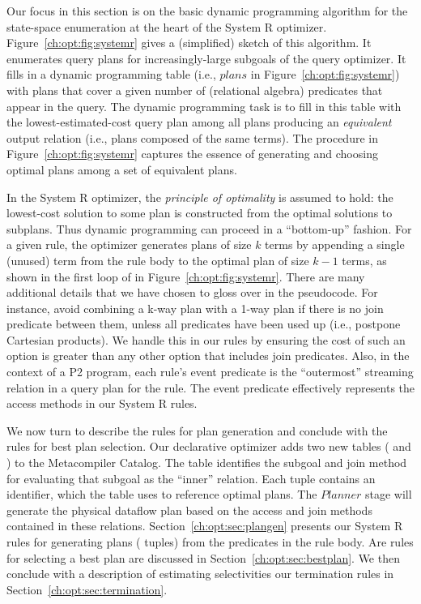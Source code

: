 Our focus in this section is on the basic dynamic programming algorithm for the
state-space enumeration at the heart of the System R optimizer.
Figure~\ref{ch:opt:fig:systemr} gives a (simplified) sketch of this
algorithm.  It enumerates query plans for increasingly-large subgoals of the
query optimizer.  It fills in a dynamic programming table (i.e., $plans$ in
Figure~\ref{ch:opt:fig:systemr}) with plans that cover a given number of
(relational algebra) predicates that appear in the query.  The dynamic
programming task is to fill in this table with the lowest-estimated-cost query
plan among all plans producing an {\em equivalent} output relation (i.e., plans
composed of the same terms).  The  procedure in
Figure~\ref{ch:opt:fig:systemr} captures the essence of generating and
choosing optimal plans among a set of equivalent plans.

In the System R optimizer, the {\em principle of optimality} is assumed to
hold: the lowest-cost solution to some plan is constructed from the optimal
solutions to subplans.  Thus dynamic programming can proceed in a ``bottom-up''
fashion.  For a given rule, the optimizer generates plans of size $k$ terms by
appending a single (unused) term from the rule body to the optimal plan of size
$k-1$ terms, as shown in the first loop of  in
Figure~\ref{ch:opt:fig:systemr}.  There are many additional details that we
have chosen to gloss over in the pseudocode.  For instance, avoid combining a
k-way plan with a 1-way plan if there is no join predicate between them, unless
all predicates have been used up (i.e., postpone Cartesian products).  We
handle this in our \OVERLOG rules by ensuring the cost of such an option is
greater than any other option that includes join predicates.  Also, in the
context of a P2 program, each rule's event predicate is the ``outermost''
streaming relation in a query plan for the rule.  The event predicate
effectively represents the access methods in our System R rules.

We now turn to describe the \OVERLOG rules for plan generation and conclude
with the rules for best plan selection.  Our declarative optimizer adds two new
tables ( and ) to the Metacompiler Catalog.  The
 table identifies the subgoal and join method for evaluating that
subgoal as the ``inner'' relation.  Each  tuple contains an
identifier, which the  table uses to reference optimal plans.  The
$Planner$ stage will generate the physical dataflow plan based on the access
and join methods contained in these relations.
Section~\ref{ch:opt:sec:plangen} presents our System R rules for generating
plans ( tuples) from the predicates in the rule body.  Are rules for
selecting a best plan are discussed in Section~\ref{ch:opt:sec:bestplan}.  We
then conclude with a description of estimating selectivities our termination
rules in Section~\ref{ch:opt:sec:termination}.

